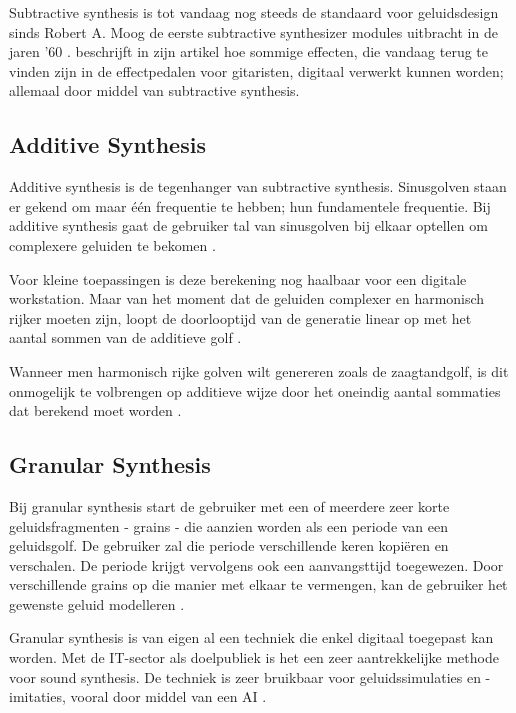 Subtractive synthesis is tot vandaag nog steeds de standaard voor geluidsdesign sinds Robert A. Moog de eerste subtractive synthesizer modules uitbracht in de jaren '60 \autocite{subtractive}. \textcite{guitarpedals} beschrijft in zijn artikel hoe sommige effecten, die vandaag terug te vinden zijn in de effectpedalen voor gitaristen, digitaal verwerkt kunnen worden; allemaal door middel van subtractive synthesis.

\subsection{Additive Synthesis}

Additive synthesis is de tegenhanger van subtractive synthesis. Sinusgolven staan er gekend om maar één frequentie te hebben; hun fundamentele frequentie. Bij additive synthesis gaat de gebruiker tal van sinusgolven bij elkaar optellen om complexere geluiden te bekomen \autocite{additive}.

Voor kleine toepassingen is deze berekening nog haalbaar voor een digitale workstation. Maar van het moment dat de geluiden complexer en harmonisch rijker moeten zijn, loopt de doorlooptijd van de generatie linear op met het aantal sommen van de additieve golf \autocite{additive}.

Wanneer men harmonisch rijke golven wilt genereren zoals de zaagtandgolf, is dit onmogelijk te volbrengen op additieve wijze door het oneindig aantal sommaties dat berekend moet worden \autocite{harmonics}.

\subsection{Granular Synthesis}

Bij granular synthesis start de gebruiker met een of meerdere zeer korte geluidsfragmenten - grains - die aanzien worden als een periode van een geluidsgolf. De gebruiker zal die periode verschillende keren kopiëren en verschalen. De periode krijgt vervolgens ook een aanvangsttijd toegewezen. Door verschillende grains op die manier met elkaar te vermengen, kan de gebruiker het gewenste geluid modelleren \autocite{granular}.

Granular synthesis is van eigen al een techniek die enkel digitaal toegepast kan worden. Met de IT-sector als doelpubliek is het een zeer aantrekkelijke methode voor sound synthesis. De techniek is zeer bruikbaar voor geluidssimulaties en -imitaties, vooral door middel van een AI \autocite{granular}.

